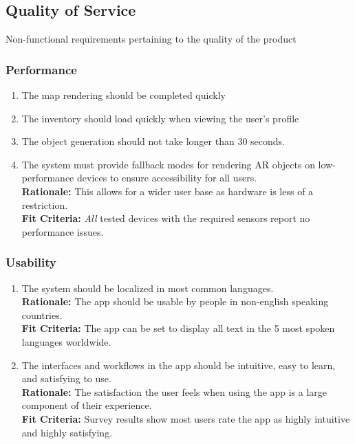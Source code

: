 \documentclass{article}
\begin{document}
\subsection{Quality of Service}

Non-functional requirements pertaining to the quality of the product


\subsubsection{Performance}
\label{sub:performance}

\begin{enumerate}[align=left, label=\textbf{QS-P\arabic*.}]
    \item The map rendering should be completed quickly
    \item The inventory should load quickly when viewing the user’s profile
    \item The object generation should not take longer than 30 seconds.
    \item The system must provide fallback modes for rendering AR objects on low-performance devices to ensure accessibility for all users. \\
          {\bf Rationale:} This allows for a wider user base as hardware is less of a restriction. \\
          {\bf Fit Criteria:} \textit{All} tested devices with the required sensors report no performance issues.

\end{enumerate}

\subsubsection{Usability}
\label{sub:usability}

\begin{enumerate}[align=left, label=\textbf{QS-U\arabic*.}]

    \item The system should be localized in most common languages. \\
          {\bf Rationale:} The app should be usable by people in non-english speaking countries. \\
          {\bf Fit Criteria:} The app can be set to display all text in the 5 most spoken languages worldwide. \\
    \item The interfaces and workflows in the app should be intuitive, easy to learn, and satisfying to use. \\
          {\bf Rationale:} The satisfaction the user feels when using the app is a large component of their experience. \\
          {\bf Fit Criteria:} Survey results show most users rate the app as highly intuitive and highly satisfying.
\end{enumerate}
\end{document}
